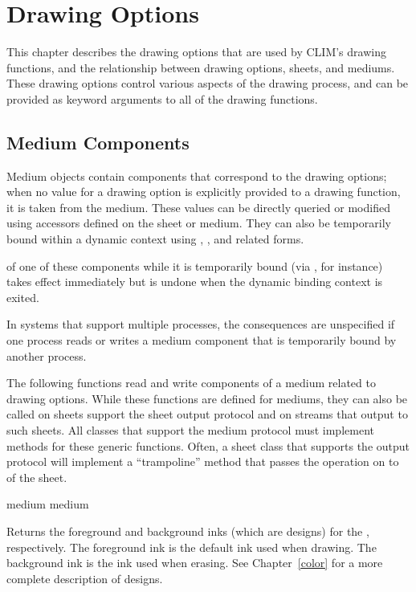 
\chapter {Drawing Options}
\label {drawing-options}

This chapter describes the drawing options that are used by CLIM's drawing
functions, and the relationship between drawing options, sheets, and mediums.
These drawing options control various aspects of the drawing process, and can be
provided as keyword arguments to all of the drawing functions.


\section {Medium Components}

Medium objects contain components that correspond to the drawing options; when
no value for a drawing option is explicitly provided to a drawing function, it
is taken from the medium.  These values can be directly queried or modified
using accessors defined on the sheet or medium.  They can also be temporarily
bound within a dynamic context using ,
, and related forms.

 of one of these components while it is temporarily bound (via
, for instance) takes effect immediately but is undone
when the dynamic binding context is exited.

In systems that support multiple processes, the consequences are unspecified if
one process reads or writes a medium component that is temporarily bound by
another process.

The following functions read and write components of a medium related to drawing
options.  While these functions are defined for mediums, they can also be called
on sheets support the sheet output protocol and on streams that output to such
sheets.  All classes that support the medium protocol must implement methods for
these generic functions.  Often, a sheet class that supports the output protocol
will implement a ``trampoline'' method that passes the operation on to
 of the sheet.


 {medium}
 {medium}

Returns the foreground and background inks (which are designs) for the
 , respectively.  The foreground ink is the default ink
used when drawing.  The background ink is the ink used when erasing.  See
Chapter~\ref{color} for a more complete description of designs.

